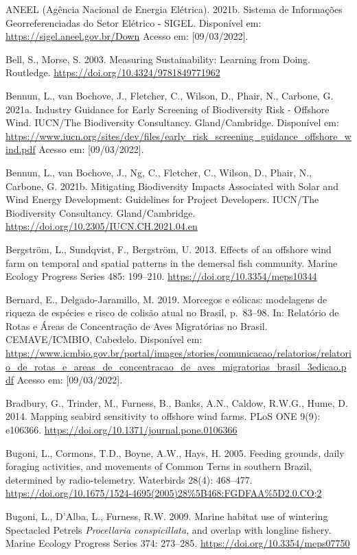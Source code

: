 \documentclass[
  oneside]{scrbook}
\begin{document}
ANEEL (Agência Nacional de Energia Elétrica). 2021b. Sistema de Informações Georreferenciadas do Setor Elétrico - SIGEL. Disponível em: \url{https://sigel.aneel.gov.br/Down} Acesso em: {[}09/03/2022{]}.

Bell, S., Morse, S. 2003. Measuring Sustainability: Learning from Doing. Routledge. \url{https://doi.org/10.4324/9781849771962}

Bennun, L., van Bochove, J., Fletcher, C., Wilson, D., Phair, N., Carbone, G. 2021a. Industry Guidance for Early Screening of Biodiversity Risk - Offshore Wind. IUCN/The Biodiversity Consultancy. Gland/Cambridge. Disponível em: \url{https://www.iucn.org/sites/dev/files/early_risk_screening_guidance_offshore_wind.pdf} Acesso em: {[}09/03/2022{]}.

Bennun, L., van Bochove, J., Ng, C., Fletcher, C., Wilson, D., Phair, N., Carbone, G. 2021b. Mitigating Biodiversity Impacts Associated with Solar and Wind Energy Development: Guidelines for Project Developers. IUCN/The Biodiversity Consultancy. Gland/Cambridge. \url{https://doi.org/10.2305/IUCN.CH.2021.04.en}

Bergström, L., Sundqvist, F., Bergström, U. 2013. Effects of an offshore wind farm on temporal and spatial patterns in the demersal fish community. Marine Ecology Progress Series 485: 199--210. \url{https://doi.org/10.3354/meps10344}

Bernard, E., Delgado-Jaramillo, M. 2019. Morcegos e eólicas: modelagens de riqueza de espécies e risco de colisão atual no Brasil, p.~83--98. In: Relatório de Rotas e Áreas de Concentração de Aves Migratórias no Brasil. CEMAVE/ICMBIO, Cabedelo. Disponível em: \url{https://www.icmbio.gov.br/portal/images/stories/comunicacao/relatorios/relatorio_de_rotas_e_areas_de_concentracao_de_aves_migratorias_brasil_3edicao.pdf} Acesso em: {[}09/03/2022{]}.

Bradbury, G., Trinder, M., Furness, B., Banks, A.N., Caldow, R.W.G., Hume, D. 2014. Mapping seabird sensitivity to offshore wind farms. PLoS ONE 9(9): e106366. \url{https://doi.org/10.1371/journal.pone.0106366}

Bugoni, L., Cormons, T.D., Boyne, A.W., Hays, H. 2005. Feeding grounds, daily foraging activities, and movements of Common Terns in southern Brazil, determined by radio-telemetry. Waterbirds 28(4): 468--477. \url{https://doi.org/10.1675/1524-4695(2005)28\%5B468:FGDFAA\%5D2.0.CO;2}

Bugoni, L., D'Alba, L., Furness, R.W. 2009. Marine habitat use of wintering Spectacled Petrels \emph{Procellaria conspicillata}, and overlap with longline fishery. Marine Ecology Progress Series 374: 273--285. \url{https://doi.org/10.3354/meps07750}
\end{document}
